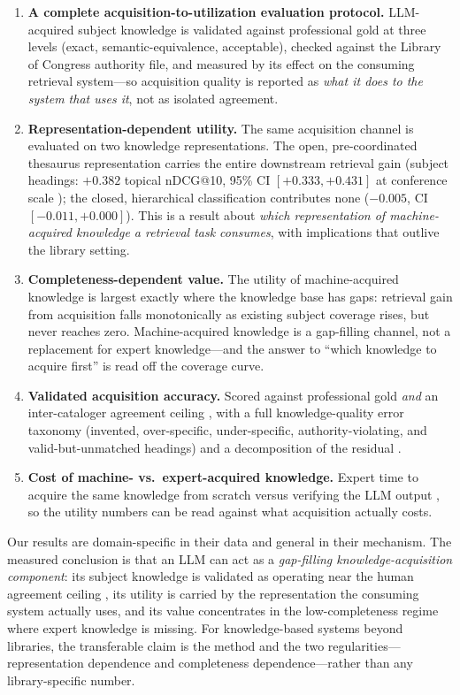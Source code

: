 \begin{enumerate}
\item \textbf{A complete acquisition-to-utilization evaluation protocol.}
  LLM-acquired subject knowledge is validated against professional gold at
  three levels (exact, semantic-equivalence, acceptable), checked against
  the Library of Congress authority file, and measured by its effect on the
  consuming retrieval system---so acquisition quality is reported as
  \emph{what it does to the system that uses it}, not as isolated
  agreement.
\item \textbf{Representation-dependent utility.} The same acquisition
  channel is evaluated on two knowledge representations. The open,
  pre-coordinated thesaurus representation carries the entire downstream
  retrieval gain (subject headings: $+0.382$ topical nDCG@10, 95\% CI
  $[+0.333,+0.431]$ at conference scale ); the closed,
  hierarchical classification contributes none ($-0.005$, CI
  $[-0.011,+0.000]$). This is a result about \emph{which representation of
  machine-acquired knowledge a retrieval task consumes}, with implications
  that outlive the library setting.
\item \textbf{Completeness-dependent value.} The utility of
  machine-acquired knowledge is largest exactly where the knowledge base
  has gaps: retrieval gain from acquisition falls monotonically as existing
  subject coverage rises, but never reaches zero. Machine-acquired knowledge
  is a gap-filling channel, not a replacement for expert knowledge---and the
  answer to ``which knowledge to acquire first'' is read off the coverage
  curve.
\item \textbf{Validated acquisition accuracy.} Scored against professional
  gold \emph{and} an inter-cataloger agreement ceiling
  , with a full knowledge-quality error taxonomy
  (invented, over-specific, under-specific, authority-violating, and
  valid-but-unmatched headings) and a decomposition of the residual
  .
\item \textbf{Cost of machine- vs.\ expert-acquired knowledge.} Expert time
  to acquire the same knowledge from scratch versus verifying the LLM
  output , so the utility numbers can be read against what
  acquisition actually costs.
\end{enumerate}

Our results are domain-specific in their data and general in their
mechanism. The measured conclusion is that an LLM can act as a
\textit{gap-filling knowledge-acquisition component}: its subject knowledge
is validated as operating near the human agreement ceiling
, its utility is carried by the
representation the consuming system actually uses, and its value
concentrates in the low-completeness regime where expert knowledge is
missing. For knowledge-based systems beyond libraries, the transferable
claim is the method and the two regularities---representation dependence and
completeness dependence---rather than any library-specific number.

